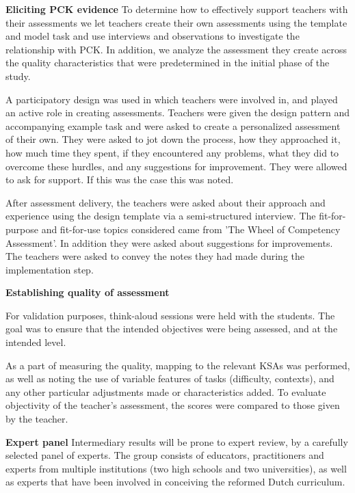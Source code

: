 \textbf{Eliciting PCK evidence}\newline
To determine how to effectively support teachers with their assessments we let teachers create their own assessments using the template and model task and use interviews and observations to investigate the relationship with PCK. In addition, we analyze the assessment they create across the quality characteristics that were predetermined in the initial phase of the study.

A participatory design was used in which teachers were involved in, and played an active role in creating assessments. Teachers were given the design pattern and accompanying example task and were asked to create a personalized assessment of their own. They were asked to jot down the process, how they approached it, how much time they spent, if they encountered any problems, what they did to overcome these hurdles, and any suggestions for improvement. They were allowed to ask for support. If this was the case this was noted.


After assessment delivery, the teachers were asked about their approach and experience using the design template via a semi-structured interview. The fit-for-purpose and fit-for-use topics considered came from 'The Wheel of Competency Assessment'. In addition they were asked about suggestions for improvements. The teachers were asked to convey the notes they had made during the implementation step.


\textbf{Establishing quality of assessment}\newline


For validation purposes, think-aloud sessions were held with the students. The goal was to ensure that the intended objectives were being assessed, and at the intended level.

As a part of measuring the quality, mapping to the relevant KSAs was performed, as well as noting the use of variable features of tasks (difficulty, contexts), and any other particular adjustments made or characteristics added. To evaluate objectivity of the teacher's assessment, the scores were compared to those given by the teacher.

\textbf{Expert panel}\newline
Intermediary results will be prone to expert review, by a carefully selected panel of experts. The group consists of educators, practitioners and experts from multiple institutions (two high schools and two universities), as well as experts that have been involved in conceiving the reformed Dutch curriculum.

